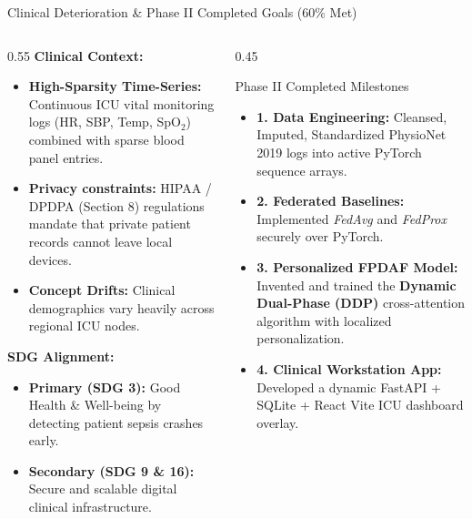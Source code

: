 \documentclass[aspectratio=169, 11pt]{beamer}
\begin{document}
\begin{frame}{Clinical Deterioration \& Phase II Completed Goals (60\% Met)}
    \begin{columns}
        \begin{column}{0.55\textwidth}
            \textbf{Clinical Context:}
            \begin{itemize}
                \scriptsize
                \item \textbf{High-Sparsity Time-Series:} Continuous ICU vital monitoring logs (HR, SBP, Temp, SpO$_2$) combined with sparse blood panel entries.
                \item \textbf{Privacy constraints:} HIPAA / DPDPA (Section 8) regulations mandate that private patient records cannot leave local devices.
                \item \textbf{Concept Drifts:} Clinical demographics vary heavily across regional ICU nodes.
            \end{itemize}
            \vspace{0.2cm}
            \textbf{SDG Alignment:}
            \begin{itemize}
                \scriptsize
                \item \textbf{Primary (SDG 3):} Good Health \& Well-being by detecting patient sepsis crashes early.
                \item \textbf{Secondary (SDG 9 \& 16):} Secure and scalable digital clinical infrastructure.
            \end{itemize}
        \end{column}
        \begin{column}{0.45\textwidth}
            \begin{block}{Phase II Completed Milestones}
                \scriptsize
                \begin{itemize}
                    \item \textbf{1. Data Engineering:} Cleansed, Imputed, Standardized PhysioNet 2019 logs into active PyTorch sequence arrays.
                    \item \textbf{2. Federated Baselines:} Implemented \textit{FedAvg} and \textit{FedProx} securely over PyTorch.
                    \item \textbf{3. Personalized FPDAF Model:} Invented and trained the \textbf{Dynamic Dual-Phase (DDP)} cross-attention algorithm with localized personalization.
                    \item \textbf{4. Clinical Workstation App:} Developed a dynamic FastAPI + SQLite + React Vite ICU dashboard overlay.
                \end{itemize}
            \end{block}
        \end{column}
    \end{columns}
\end{frame}
\end{document}
